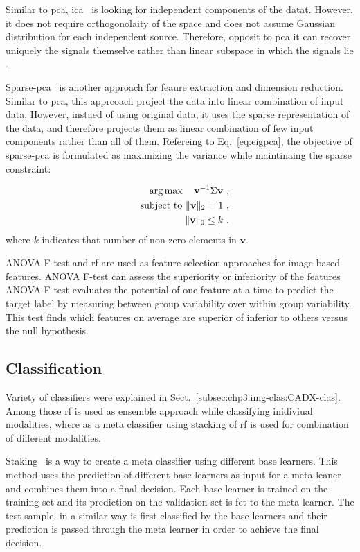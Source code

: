 Similar to \ac{pca}, \ac{ica}~\cite{comon1994independent} is looking for independent components of the datat.
However, it does not require orthogonolaity of the space and does not assume Gaussian distribution for each independent source.
Therefore, opposit to \ac{pca} it can recover uniquely the signals themselve rather than  linear subspace in which the signals lie \cite{murphy2012machine}.

Sparse-\ac{pca}~\cite{zou2006sparse} is another approach for feaure extraction and dimension reduction.
Similar to \ac{pca}, this apprcoach project the data into linear combination of input data.
However, instaed of using original data, it uses the sparse representation of the data, and therefore projects them as linear combination of few input components rather than all of them.
Refereing to Eq.~\eqref{eq:eigpca}, the objective of sparse-\ac{pca} is formulated as maximizing the variance while maintinaing the sparse constraint:

\begin{eqnarray}
 && \operatorname*{arg\,max} \quad   \mathbf{v}^{-1} \Sigma \mathbf{v}\ , \label{eq:sparsepca}\\ 
 && \text{subject to }  \Vert \mathbf{v} \Vert_{2} = 1\ , \nonumber \\
 && \Vert \mathbf{v} \Vert_{0} \leq k\ . \nonumber
\end{eqnarray}
\noindent where $k$ indicates that number of non-zero elements in $\mathbf{v}$.

ANOVA F-test and \ac{rf} are used as feature selection approaches for image-based features.
ANOVA F-test can assess the superiority or inferiority of the features 
ANOVA F-test evaluates the potential of one feature at a time to predict the target label by measuring between group variability over within group variability.
This test finds which features on average are superior of inferior to others versus the null hypothesis.


\subsection{Classification}\label{subsec:chp6:method:clas}
Variety of classifiers were explained in Sect.~\ref{subsec:chp3:img-clas:CADX-clas}. 
Among those \ac{rf} is used as ensemble approach while classifying inidiviual modalities, where as a meta classifier using stacking of \ac{rf} is used for combination of different modalities.

Staking~\cite{wolpert1992stacked} is a way to create a meta classifier using different base learners.
This method uses the prediction of different base learners as input for a meta leaner and combines them into a final decision.
Each base learner is trained on the training set and its prediction on the validation set is fet to the meta learner.
The test sample, in a similar way is first classified by the base learners and their prediction is passed through the meta learner in order to achieve the final decision.

 
